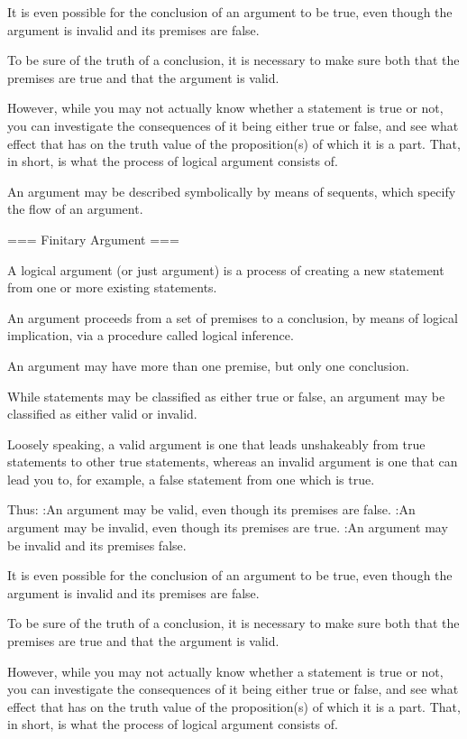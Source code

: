 It is even possible for the conclusion of an argument to be true, even though the argument is invalid and its premises are false.


To be sure of the truth of a conclusion, it is necessary to make sure both that the premises are true and that the argument is valid.


However, while you may not actually know whether a statement is true or not, you can investigate the consequences of it being either true or false, and see what effect that has on the truth value of the proposition(s) of which it is a part. That, in short, is what the process of logical argument consists of.


An argument may be described symbolically by means of sequents, which specify the flow of an argument.


=== Finitary Argument ===

A logical argument (or just argument) is a process of creating a new statement from one or more existing statements.

An argument proceeds from a set of premises to a conclusion, by means of logical implication, via a procedure called logical inference.


An argument may have more than one premise, but only one conclusion.


While statements may be classified as either true or false, an argument may be classified as either valid or invalid.


Loosely speaking, a valid argument is one that leads unshakeably from true statements to other true statements, whereas an invalid argument is one that can lead you to, for example, a false statement from one which is true.


Thus:
:An argument may be valid, even though its premises are false.
:An argument may be invalid, even though its premises are true.
:An argument may be invalid and its premises false.

It is even possible for the conclusion of an argument to be true, even though the argument is invalid and its premises are false.


To be sure of the truth of a conclusion, it is necessary to make sure both that the premises are true and that the argument is valid.


However, while you may not actually know whether a statement is true or not, you can investigate the consequences of it being either true or false, and see what effect that has on the truth value of the proposition(s) of which it is a part. That, in short, is what the process of logical argument consists of.


